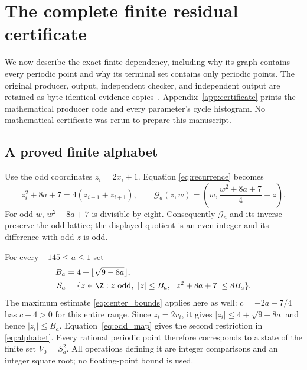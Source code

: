 \section{The complete finite residual certificate}
\label{sec:finite}

We now describe the exact finite dependency, including why its graph
contains every periodic point and why its terminal set contains
only periodic points. The original producer, output, independent
checker, and independent output are retained as byte-identical
evidence copies~\cite{am1certificate}. Appendix~\ref{app:certificate}
prints the mathematical producer code and every parameter's cycle
histogram. No mathematical certificate was rerun to prepare this
manuscript.

\subsection{A proved finite alphabet}

Use the odd coordinates $z_i=2x_i+1$. Equation
\eqref{eq:recurrence} becomes
\begin{equation}
 z_i^2+8a+7=4(z_{i-1}+z_{i+1}),\qquad
 \mathcal G_a(z,w)=\left(w,\frac{w^2+8a+7}{4}-z\right).
 \label{eq:odd_map}
\end{equation}
For odd $w$, $w^2+8a+7$ is divisible by eight. Consequently
$\mathcal G_a$ and its inverse preserve the odd lattice; the
displayed quotient is an even integer and its difference with
odd $z$ is odd.

For every $-145\le a\le1$ set
\begin{equation}
 \begin{split}
 B_a&=4+\lfloor\sqrt{9-8a}\rfloor,\\
 S_a&=\{z\in\Z:z\text{ odd},\ |z|\le B_a,
                   \ |z^2+8a+7|\le8B_a\}.
 \end{split}
 \label{eq:alphabet}
\end{equation}
The maximum estimate \eqref{eq:center_bounds} applies here as
well: $c=-2a-7/4$ has $c+4>0$ for this entire range.
Since $z_i=2v_i$, it gives
$|z_i|\le4+\sqrt{9-8a}$ and hence $|z_i|\le B_a$.
Equation~\eqref{eq:odd_map} gives the second restriction in
\eqref{eq:alphabet}. Every rational periodic point therefore
corresponds to a state of the finite set $V_0=S_a^2$.
All operations defining it are integer comparisons and an integer
square root; no floating-point bound is used.

